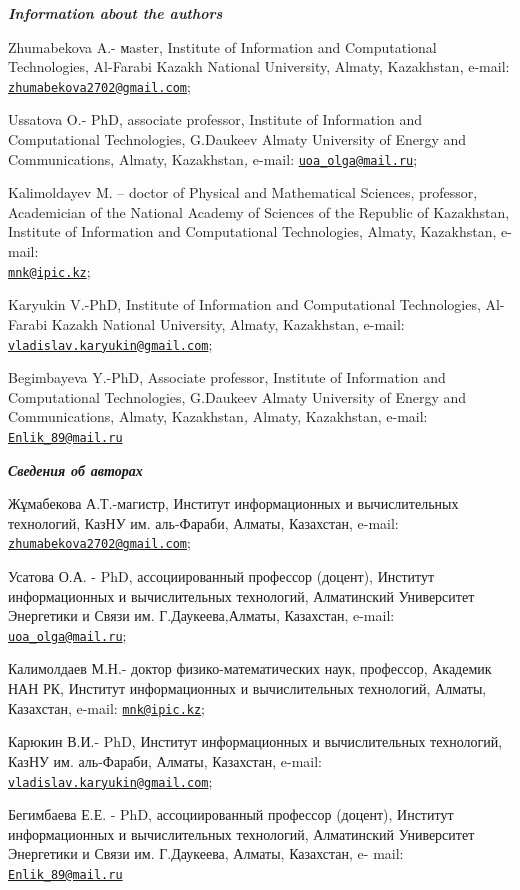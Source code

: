 \begin{authorinfo}
\hspace{1em}\emph{{\bfseries Information about the authors}}

Zhumabekova A.- мaster, Institute of Information and Computational
Technologies, Al-Farabi Kazakh National University, Almaty, Kazakhstan,
e-mail:
\href{mailto:zhumabekova2702@gmail.com}{\nolinkurl{zhumabekova2702@gmail.com}};

Ussatova O.- PhD, associate professor, Institute of Information and
Computational Technologies, G.Daukeev Almaty University of Energy and
Communications, Almaty, Kazakhstan\emph{,} e-mail:
\href{mailto:uoa_olga@mail.ru}{\nolinkurl{uoa\_olga@mail.ru}};

Kalimoldayev M. -- doctor of Physical and Mathematical Sciences,
professor, Academician of the National Academy of Sciences of the
Republic of Kazakhstan, Institute of Information and Computational
Technologies, Almaty, Kazakhstan, e-mail:
\\\href{mailto:mnk@ipic.kz}{\nolinkurl{mnk@ipic.kz}};

Karyukin V.-PhD, Institute of Information and Computational
Technologies, Al-Farabi Kazakh National University, Almaty, Kazakhstan,
e-mail:
\href{mailto:vladislav.karyukin@gmail.com}{\nolinkurl{vladislav.karyukin@gmail.com}};

Begimbayeva Y.-PhD, Associate professor, Institute of Information and
Computational Technologies, G.Daukeev Almaty University of Energy and
Communications, Almaty, Kazakhstan\emph{,} Almaty, Kazakhstan, e-mail:
\href{mailto:Enlik_89@mail.ru}{\nolinkurl{Enlik\_89@mail.ru}}

\hspace{1em}\emph{{\bfseries Сведения об авторах}}

Жұмабекова А.Т.-магистр, Институт информационных и вычислительных
технологий, КазНУ им. аль-Фараби, Алматы, Казахстан, e-mail:
\href{mailto:zhumabekova2702@gmail.com}{\nolinkurl{zhumabekova2702@gmail.com}};

Усатова О.А. - PhD, ассоциированный профессор (доцент), Институт
информационных и вычислительных технологий, Алматинский Университет
Энергетики и Связи им. Г.Даукеева,Алматы, Казахстан, e-mail:
\href{mailto:uoa_olga@mail.ru}{\nolinkurl{uoa\_olga@mail.ru}};

Калимолдаев М.Н.- доктор физико-математических наук, профессор, Академик
НАН РК, Институт информационных и вычислительных технологий, Алматы,
Казахстан, e-mail: \href{mailto:mnk@ipic.kz}{\nolinkurl{mnk@ipic.kz}};

Карюкин В.И.- PhD, Институт информационных и вычислительных технологий,
КазНУ им. аль-Фараби, Алматы, Казахстан, e-mail:
\href{mailto:vladislav.karyukin@gmail.com}{\nolinkurl{vladislav.karyukin@gmail.com}};

Бегимбаева Е.Е. - PhD, ассоциированный профессор (доцент), Институт
информационных и вычислительных технологий, Алматинский Университет
Энергетики и Связи им. Г.Даукеева, Алматы, Казахстан, e- mail:
\href{mailto:Enlik_89@mail.ru}{\nolinkurl{Enlik\_89@mail.ru}}
\end{authorinfo}
